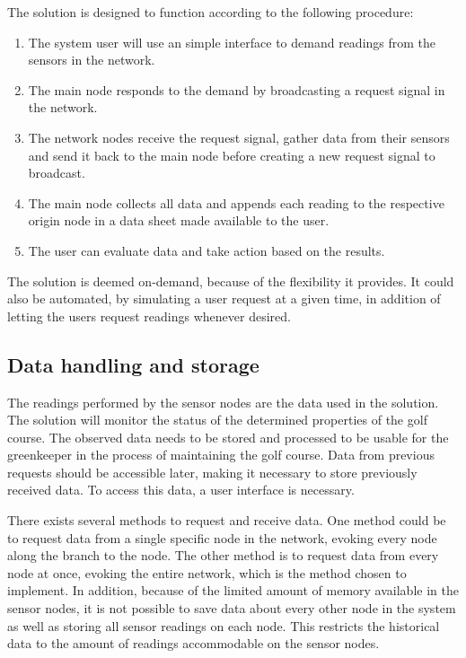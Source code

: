 The solution is designed to function according to the following procedure:
\begin{enumerate}
	\item The system user will use an simple interface to demand readings from the sensors in the network.
	\item The main node responds to the demand by broadcasting a request signal in the network.
	\item The network nodes receive the request signal, gather data from their sensors and send it back to the main node before creating a new request signal to broadcast.
	\item The main node collects all data and appends each reading to the respective origin node in a data sheet made available to the user.
	\item The user can evaluate data and take action based on the results.
\end{enumerate}

The solution is deemed on-demand, because of the flexibility it provides. It could also be automated, by simulating a user request at a given time, in addition of letting the users request readings whenever desired.


\subsection{Data handling and storage}
The readings performed by the sensor nodes are the data used in the solution. The solution will monitor the status of the determined properties of the golf course. The observed data needs to be stored and processed to be usable for the greenkeeper in the process of maintaining the golf course. Data from previous requests should be accessible later, making it necessary to store previously received data. To access this data, a user interface is necessary. 

There exists several methods to request and receive data. One method could be to request data from a single specific node in the network, evoking every node along the branch to the node. The other method is to request data from every node at once, evoking the entire network, which is the method chosen to implement. In addition, because of the limited amount of memory available in the sensor nodes, it is not possible to save data about every other node in the system as well as storing all sensor readings on each node. This restricts the historical data to the amount of readings accommodable on the sensor nodes.

